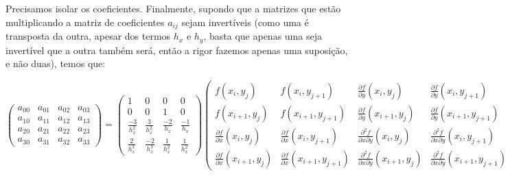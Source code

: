 \documentclass[11pt]{article}
\begin{document}
  Precisamos isolar os coeficientes. Finalmente, supondo que a matrizes que estão multiplicando a matriz de coeficientes $a_{ij}$ sejam invertíveis
  (como uma é transposta da outra, apesar dos termos $h_x$ e $h_y$, basta que apenas uma seja invertível que a outra também será, então a rigor fazemos
  apenas uma suposição, e não duas), temos que:

  \hspace*{-2.5cm}
  {\footnotesize
  $\begin{pmatrix}
    a_{00}  & a_{01} & a_{02} & a_{03} \\
    a_{10}  & a_{11} & a_{12} & a_{13} \\
    a_{20}  & a_{21} & a_{22} & a_{23} \\
    a_{30}  & a_{31} & a_{32} & a_{33}
  \end{pmatrix} =
  \begin{pmatrix}
    1  & 0   & 0     & 0     \\
    0  & 0   & 1     & 0 \\
    \frac{-3}{h_x^2}  & \frac{3}{h_x^2}   & \frac{-2}{h_x}     & \frac{-1}{h_x}    \\
    \frac{2}{h_x^3}  & \frac{-2}{h_x^3}   & \frac{1}{h_x^2}  & \frac{1}{h_x^2}
  \end{pmatrix}
  \begin{pmatrix}
    f(x_i, y_j)                                   & f(x_i, y_{j + 1})                                   & \frac{\partial f}{\partial y}(x_i, y_j)                    & \frac{\partial f}{\partial y}(x_i, y_{j + 1}) \\
    f(x_{i + 1}, y_j)                             & f(x_{i + 1}, y_{j + 1})                             & \frac{\partial f}{\partial y}(x_{i + 1}, y_j)              & \frac{\partial f}{\partial y}(x_{i + 1}, y_{j + 1}) \\
    \frac{\partial f}{\partial x}(x_i, y_j)       & \frac{\partial f}{\partial x}(x_i, y_{j + 1})       & \frac{\partial^2 f}{\partial x \partial y}(x_i, y_j)       & \frac{\partial^2 f}{\partial x \partial y}(x_i, y_{j + 1}) \\
    \frac{\partial f}{\partial x}(x_{i + 1}, y_j) & \frac{\partial f}{\partial x}(x_{i + 1}, y_{j + 1}) & \frac{\partial^2 f}{\partial x \partial y}(x_{i + 1}, y_j) & \frac{\partial^2 f}{\partial x \partial y}(x_{i + 1}, y_{j + 1})
  \end{pmatrix}
  \begin{pmatrix}
    1  & 0 & \frac{-3}{h_y^2} & \frac{2}{h_y^3} \\
    0  & 0 & \frac{3}{h_y^2} & \frac{-2}{h_y^3} \\
    0  & 1 & \frac{-2}{h_y} & \frac{1}{h_y^2} \\
    0  & 0 & \frac{-1}{h_y} & \frac{1}{h_y^2}
  \end{pmatrix}$}\newline
\end{document}
